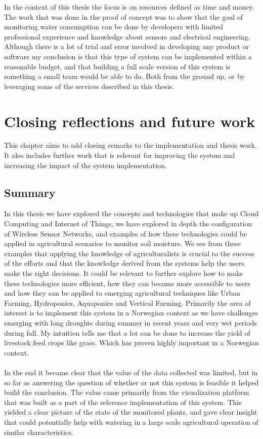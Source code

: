 \documentclass[]{uiophd}
\begin{document}
In the context of this thesis the focus is on resources defined as time and money. The work that was done in the proof of concept was to show that the goal of monitoring water consumption can be done by developers with limited professional experience and knowledge about sensors and electrical engineering. Although there is a lot of trial and error involved in developing any product or software my conclusion is that this type of system can be implemented within a reasonable budget, and that building a full scale version of this system is something a small team would be able to do. Both from the ground up, or by leveraging some of the services described in this thesis.


\chapter{Closing reflections and future work}

This chapter aims to add closing remarks to the implementation and thesis work. It also includes further work that is relevant for improving the system and increasing the impact of the system implementation.

\section{Summary}
In this thesis we have explored the concepts and technologies that make up Cloud Computing and Internet of Things, we have explored in depth the configuration of Wireless Sensor Networks, and examples of how these technologies could be applied in agricultural scenarios to monitor soil moisture. We see from these examples that applying the knowledge of agriculturalists is crucial to the success of the efforts and that the knowledge derived from the systems help the users make the right decisions. It could be relevant to further explore how to make these technologies more efficient, how they can become more accessible to users and how they can be applied to emerging agricultural techniques like Urban Farming, Hydroponics, Aquaponics and Vertical Farming. Primarily the area of interest is to implement this system in a Norwegian context as we have challenges emerging with long droughts during summer in recent years and very wet periods during fall. My intuition tells me that a lot can be done to increase the yield of livestock feed crops like grass. Which has proven highly important in a Norwegian context.
\\\\
In the end it became clear that the value of the data collected was limited, but in so far as answering the question of whether or not this system is feasible it helped build the conclusion. The value came primarily from the visualization platform that was built as a part of the reference implementation of this system. This yielded a clear picture of the state of the monitored plants, and gave clear insight that could potentially help with watering in a large scale agricultural operation of similar characteristics.
\end{document}
